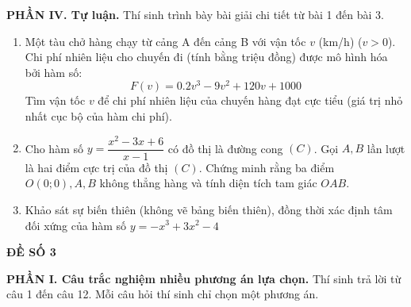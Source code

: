 \documentclass[12pt]{article}
\begin{document}
	\vspace{4mm}
	\noindent\textbf{PHẦN IV. Tự luận.} Thí sinh trình bày bài giải chi tiết từ bài 1 đến bài 3.
	\vspace{2mm}
	
	\begin{enumerate}[label=\textbf{Bài \arabic*.}, leftmargin=*]
		
		\item Một tàu chở hàng chạy từ cảng A đến cảng B với vận tốc $v$ (km/h) ($v > 0$). Chi phí nhiên liệu cho chuyến đi (tính bằng triệu đồng) được mô hình hóa bởi hàm số:
		\[ F(v) = 0.2v^3 - 9v^2 + 120v + 1000 \]
		Tìm vận tốc $v$ để chi phí nhiên liệu của chuyến hàng đạt cực tiểu (giá trị nhỏ nhất cục bộ của hàm chi phí).
		
		\vspace{2mm}
		\item Cho hàm số $y = \dfrac{x^2 - 3x + 6}{x - 1}$ có đồ thị là đường cong $(C)$. Gọi $A, B$ lần lượt là hai điểm cực trị của đồ thị $(C)$. Chứng minh rằng ba điểm $O(0;0), A, B$ không thẳng hàng và tính diện tích tam giác $OAB$.
		
		\vspace{2mm}
		\item Khảo sát sự biến thiên (không vẽ bảng biến thiên), đồng thời xác định tâm đối xứng của hàm số $y = -x^3 + 3x^2 - 4$
		
	\end{enumerate}
	
	
	\newpage %
	\begin{center}
		{\LARGE \textbf{ĐỀ SỐ 3}}\\[4pt]
	\end{center}
	\vspace{4mm}
	
	\noindent\textbf{PHẦN I. Câu trắc nghiệm nhiều phương án lựa chọn.} Thí sinh trả lời từ câu 1 đến câu 12. Mỗi câu hỏi thí sinh chỉ chọn một phương án.
	\vspace{2mm}
	
\end{document}
